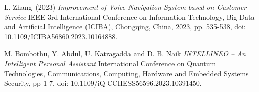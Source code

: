 \begin{thebibliography}{999}
L. Zhang~(2023)
{\it Improvement of Voice Navigation System based on Customer Service}
 IEEE 3rd International Conference on Information Technology, Big Data and Artificial Intelligence (ICIBA), Chongqing, China, 2023, pp. 535-538, doi: 10.1109/ICIBA56860.2023.10164888.

M. Bombothu, Y. Abdul, U. Katragadda and D. B. Naik
{\it INTELLINEO – An Intelligent Personal Assistant}
International Conference on Quantum Technologies, Communications, Computing, Hardware and Embedded Systems Security, pp 1-7, doi: 10.1109/iQ-CCHESS56596.2023.10391450.

\end{thebibliography}




